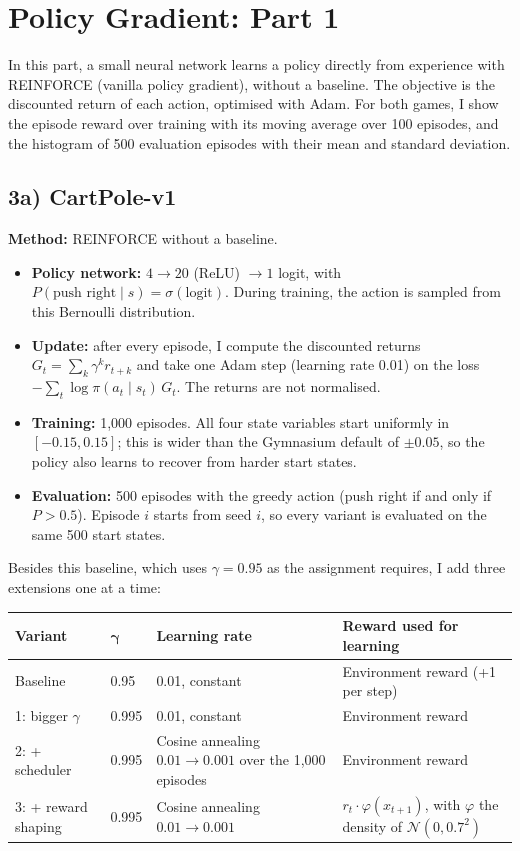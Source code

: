\section{Policy Gradient: Part 1}
\label{sec:pg1}

In this part, a small neural network learns a policy directly from experience with REINFORCE (vanilla policy gradient), without a baseline. The objective is the discounted return of each action, optimised with Adam. For both games, I show the episode reward over training with its moving average over 100 episodes, and the histogram of 500 evaluation episodes with their mean and standard deviation.

\subsection{3a) CartPole-v1}

\textbf{Method:} REINFORCE without a baseline.
\begin{itemize}
  \item \textbf{Policy network:} $4 \to 20$ (ReLU) $\to 1$ logit, with $P(\text{push right} \mid s) = \sigma(\text{logit})$. During training, the action is sampled from this Bernoulli distribution.
  \item \textbf{Update:} after every episode, I compute the discounted returns $G_t = \sum_k \gamma^k r_{t+k}$ and take one Adam step (learning rate 0.01) on the loss $-\sum_t \log \pi(a_t \mid s_t)\, G_t$. The returns are not normalised.
  \item \textbf{Training:} 1,000 episodes. All four state variables start uniformly in $[-0.15, 0.15]$; this is wider than the Gymnasium default of $\pm 0.05$, so the policy also learns to recover from harder start states.
  \item \textbf{Evaluation:} 500 episodes with the greedy action (push right if and only if $P > 0.5$). Episode $i$ starts from seed $i$, so every variant is evaluated on the same 500 start states.
\end{itemize}

Besides this baseline, which uses $\gamma = 0.95$ as the assignment requires, I add three extensions one at a time:

\begin{center}
\small
\begin{tabularx}{\textwidth}{@{}llLL@{}}
  \toprule
  \textbf{Variant} & $\boldsymbol{\gamma}$ & \textbf{Learning rate} & \textbf{Reward used for learning} \\
  \midrule
  Baseline & 0.95 & 0.01, constant & Environment reward (+1 per step) \\
  1: bigger $\gamma$ & 0.995 & 0.01, constant & Environment reward \\
  2: + scheduler & 0.995 & Cosine annealing $0.01 \to 0.001$ over the 1,000 episodes & Environment reward \\
  3: + reward shaping & 0.995 & Cosine annealing $0.01 \to 0.001$ & $r_t \cdot \varphi(x_{t+1})$, with $\varphi$ the density of $\mathcal{N}(0, 0.7^2)$ \\
  \bottomrule
\end{tabularx}
\end{center}

